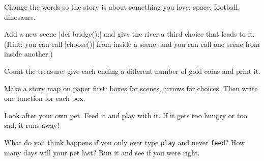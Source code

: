 \begin{challenge}[Level up]
\tick Change the words so the story is about something you love: space, football, dinosaurs.\par
\tick Add a new scene \py|def bridge():| and give the river a third choice that leads to it. (Hint: you can call \py|choose()| from inside a scene, and you can call one scene from inside another.)\par
\tick Count the treasure: give each ending a different number of gold coins and print it.\par
\tick Make a story map on paper first: boxes for scenes, arrows for choices. Then write one function for each box.
\end{challenge}


Look after your own pet. Feed it and play with it. If it gets too hungry or too sad, it runs away!

\begin{center}
\begin{scratch}[scale=0.8]
\end{scratch}
\end{center}

\begin{think}
What do you think happens if you only ever type \texttt{play} and never \texttt{feed}? How many days will your pet last? Run it and see if you were right.
\end{think}

